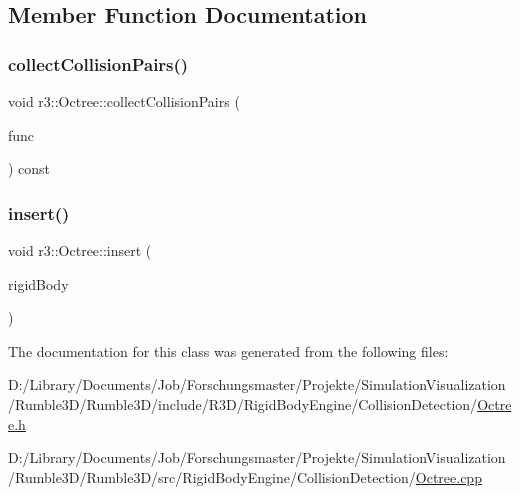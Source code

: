 \subsection{Member Function Documentation}
\mbox{\label{classr3_1_1_octree_aca2c5fa53dc0c7f6b3f9b97e7e6c2375}} 
\subsubsection{\texorpdfstring{collect\+Collision\+Pairs()}{collectCollisionPairs()}}
{\footnotesize\ttfamily void r3\+::\+Octree\+::collect\+Collision\+Pairs (\begin{DoxyParamCaption}\item[{const \mbox{\hyperlink{classr3_1_1_octree_a39df948aedb55b9aaea780e7c6790bbd}{Insert\+Function}} \&}]{func }\end{DoxyParamCaption}) const}

\mbox{\label{classr3_1_1_octree_a846b91cbb3ce3a66a61a857dca3c266c}} 
\subsubsection{\texorpdfstring{insert()}{insert()}}
{\footnotesize\ttfamily void r3\+::\+Octree\+::insert (\begin{DoxyParamCaption}\item[{\mbox{\hyperlink{classr3_1_1_rigid_body}{Rigid\+Body}} $\ast$}]{rigid\+Body }\end{DoxyParamCaption})}



The documentation for this class was generated from the following files\+:\begin{DoxyCompactItemize}
\item 
D\+:/\+Library/\+Documents/\+Job/\+Forschungsmaster/\+Projekte/\+Simulation\+Visualization/\+Rumble3\+D/\+Rumble3\+D/include/\+R3\+D/\+Rigid\+Body\+Engine/\+Collision\+Detection/\mbox{\hyperlink{_octree_8h}{Octree.\+h}}\item 
D\+:/\+Library/\+Documents/\+Job/\+Forschungsmaster/\+Projekte/\+Simulation\+Visualization/\+Rumble3\+D/\+Rumble3\+D/src/\+Rigid\+Body\+Engine/\+Collision\+Detection/\mbox{\hyperlink{_octree_8cpp}{Octree.\+cpp}}\end{DoxyCompactItemize}
